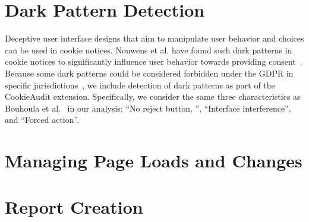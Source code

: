 \section{Dark Pattern Detection}
Deceptive user interface designs that aim to manipulate user behavior and choices can be used in cookie notices.
Nouwens et al. have found such dark patterns in cookie notices to significantly influence user behavior towards providing consent~\cite{nouwens2020dark}.
Because some dark patterns could be considered forbidden under the GDPR in specific jurisdictions~\cite{gray2021dark}, we include detection of dark patterns as part of the CookieAudit extension.
Specifically, we consider the same three characteristics as Bouhoula et al.~\cite{bouhoula2023automated} in our analysis: \enquote{No reject button, }, \enquote{Interface interference}, and \enquote{Forced action}.

\section{Managing Page Loads and Changes}
\section{Report Creation}